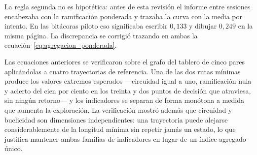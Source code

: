 \documentclass{book}
\begin{document}
La regla segunda no es hipotética: antes de esta revisión el informe
entre sesiones encabezaba con la ramificación ponderada y trazaba la
curva con la media por intento. En las bitácoras piloto eso significaba
escribir $0{,}133$ y dibujar $0{,}249$ en la misma página. La
discrepancia se corrigió trazando en ambas la ecuación~\ref{eq:agregacion_ponderada}.

\begin{table}[H]
\centering
\caption{Resumen de métricas para el análisis de trayectorias.}
\label{tab:resumen_metricas}
\renewcommand{\arraystretch}{1.35}
\end{table}

Las ecuaciones anteriores se verificaron sobre el grafo del tablero
de cinco pares aplicándolas a cuatro trayectorias de referencia. Una
de las dos rutas mínimas produce los valores extremos esperados
—circuidad igual a uno, ramificación nula y acierto del cien por
ciento en los treinta y dos puntos de decisión que atraviesa, sin
ningún retorno— y
los indicadores se separan de forma monótona a medida que aumenta la
exploración. La verificación mostró además que circuidad y
buclicidad son dimensiones independientes: una trayectoria puede
alejarse considerablemente de la longitud mínima sin repetir jamás un
estado, lo que justifica mantener ambas familias de indicadores en
lugar de un índice agregado único.
\end{document}
